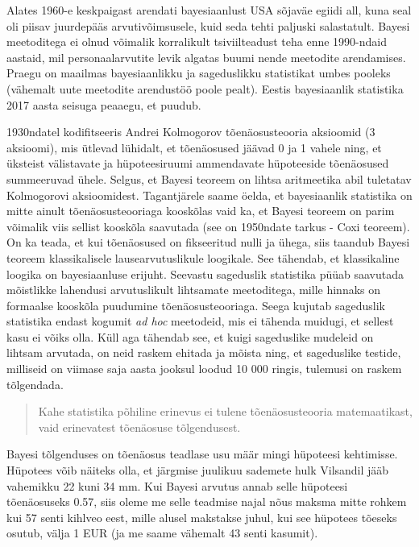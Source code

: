 \documentclass[]{book}
\begin{document}
Alates 1960-e keskpaigast arendati bayesiaanlust USA sõjaväe egiidi all,
kuna seal oli piisav juurdepääs arvutivõimsusele, kuid seda tehti
paljuski salastatult. Bayesi meetoditega ei olnud võimalik korralikult
tsiviilteadust teha enne 1990-ndaid aastaid, mil personaalarvutite levik
algatas buumi nende meetodite arendamises. Praegu on maailmas
bayesiaanlikku ja sageduslikku statistikat umbes pooleks (vähemalt uute
meetodite arendustöö poole pealt). Eestis bayesiaanlik statistika 2017
aasta seisuga peaaegu, et puudub.

1930ndatel kodifitseeris Andrei Kolmogorov tõenäosusteooria aksioomid (3
aksioomi), mis ütlevad lühidalt, et tõenäosused jäävad 0 ja 1 vahele
ning, et üksteist välistavate ja hüpoteesiruumi ammendavate hüpoteeside
tõenäosused summeeruvad ühele. Selgus, et Bayesi teoreem on lihtsa
aritmeetika abil tuletatav Kolmogorovi aksioomidest. Tagantjärele saame
öelda, et bayesiaanlik statistika on mitte ainult tõenäosusteooriaga
kooskõlas vaid ka, et Bayesi teoreem on parim võimalik viis sellist
kooskõla saavutada (see on 1950ndate tarkus - Coxi teoreem). On ka
teada, et kui tõenäosused on fikseeritud nulli ja ühega, siis taandub
Bayesi teoreem klassikalisele lausearvutuslikule loogikale. See
tähendab, et klassikaline loogika on bayesiaanluse erijuht. Seevastu
sageduslik statistika püüab saavutada mõistlikke lahendusi arvutuslikult
lihtsamate meetoditega, mille hinnaks on formaalse kooskõla puudumine
tõenäosusteooriaga. Seega kujutab sageduslik statistika endast kogumit
\emph{ad hoc} meetodeid, mis ei tähenda muidugi, et sellest kasu ei
võiks olla. Küll aga tähendab see, et kuigi sageduslike mudeleid on
lihtsam arvutada, on neid raskem ehitada ja mõista ning, et sageduslike
testide, milliseid on viimase saja aasta jooksul loodud 10 000 ringis,
tulemusi on raskem tõlgendada.

\begin{quote}
Kahe statistika põhiline erinevus ei tulene tõenäosusteooria
matemaatikast, vaid erinevatest tõenäosuse tõlgendusest.
\end{quote}

Bayesi tõlgenduses on tõenäosus teadlase usu määr mingi hüpoteesi
kehtimisse. Hüpotees võib näiteks olla, et järgmise juulikuu sademete
hulk Vilsandil jääb vahemikku 22 kuni 34 mm. Kui Bayesi arvutus annab
selle hüpoteesi tõenäosuseks 0.57, siis oleme me selle teadmise najal
nõus maksma mitte rohkem kui 57 senti kihlveo eest, mille alusel
makstakse juhul, kui see hüpotees tõeseks osutub, välja 1 EUR (ja me
saame vähemalt 43 senti kasumit).
\end{document}
